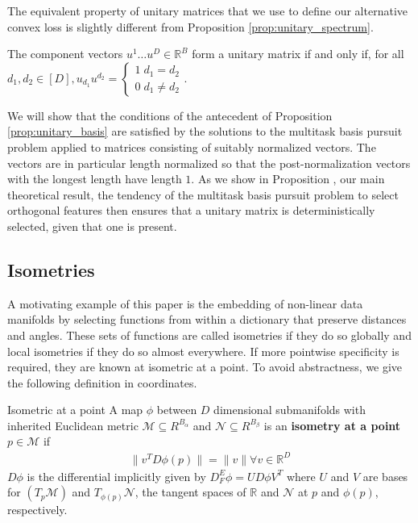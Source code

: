 The equivalent property of unitary matrices that we use to define our alternative convex loss is slightly different from Proposition \ref{prop:unitary_spectrum}.
\begin{proposition}
\label{prop:unitary_basis}
The component vectors $u^1 \dots u^D \in \mathbb R^B$ form a unitary matrix if and only if, for all $d_1, d_2 \in [D], u_{d_1} u^{d_2} = \begin{cases}
1 \; d_1 = d_2\\ 
0 \; d_1 \neq d_2 
\end{cases}$.
\end{proposition}

We will show that the conditions of the antecedent of Proposition \ref{prop:unitary_basis} are satisfied by the solutions to the multitask basis pursuit problem applied to matrices consisting of suitably normalized vectors.
The vectors are in particular length normalized so that the post-normalization vectors with the longest length have length $1$.
As we show in Proposition , our main theoretical result,  the tendency of the multitask basis pursuit problem to select orthogonal features then ensures that a unitary matrix is deterministically selected, given that one is present.


\subsection{Isometries}

A motivating example of this paper is the embedding of non-linear data manifolds by selecting functions from within a dictionary that preserve distances and angles.
These sets of functions are called isometries if they do so globally and local isometries if they do so almost everywhere.
If more pointwise specificity is required, they are known at isometric at a point.
To avoid abstractness, we give the following definition in coordinates.
\begin{definition}{Isometric at a point}
\label{def:isometric_at_a_point}
A map $\phi$ between $D$ dimensional submanifolds with inherited Euclidean metric $\mathcal M \subseteq R^{B_\alpha}$ and $\mathcal N  \subseteq R^{B_\beta}$ is an \textbf{isometry at a point} $p \in \mathcal M$ if
\begin{align}
\| v^T D \phi (p) \| = \|v\| \forall v \in \mathbb R^D
\end{align}
$D \phi$ is the differential implicitly given by $D_{F}^E \phi = U D \phi V^T$ where $U$ and $V$ are bases for $(T_p \mathcal M)$ and $T_{\phi(p)} \mathcal N$, the tangent spaces of $\mathbb R$ and $\mathcal N$ at $p$ and $\phi(p)$, respectively.
\end{definition}

